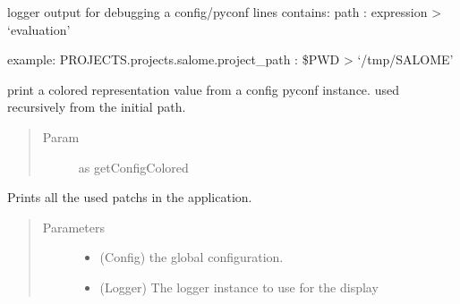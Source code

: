 \documentclass[a4paper,10pt,english]{sphinxmanual}
\begin{document}

\begin{fulllineitems}
\label{\detokenize{apidoc_src/src:src.configManager.print_debug}}
logger output for debugging a config/pyconf
lines contains: path : expression \textendash{}\textgreater{} ‘evaluation’

example:
PROJECTS.projects.salome.project\_path : \$PWD \textendash{}\textgreater{} ‘/tmp/SALOME’

\end{fulllineitems}


\begin{fulllineitems}
\label{\detokenize{apidoc_src/src:src.configManager.print_value}}
print a colored representation value from a config pyconf instance.
used recursively from the initial path.
\begin{quote}\begin{description}
\item[{Param}] \leavevmode
as getConfigColored

\end{description}\end{quote}

\end{fulllineitems}


\begin{fulllineitems}
\label{\detokenize{apidoc_src/src:src.configManager.show_patchs}}
Prints all the used patchs in the application.
\begin{quote}\begin{description}
\item[{Parameters}] \leavevmode\begin{itemize}
\item {} 
 \textendash{} (Config) the global configuration.

\item {} 
 \textendash{} (Logger) 
The logger instance to use for the display

\end{itemize}

\end{description}\end{quote}

\end{fulllineitems}
\end{document}
